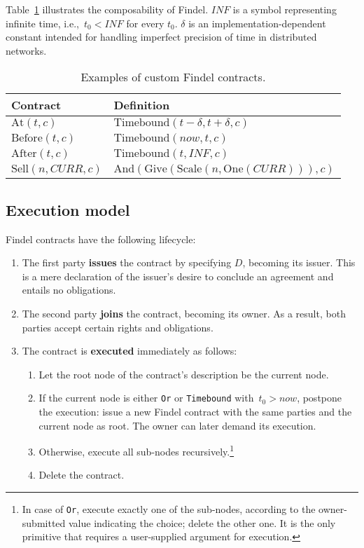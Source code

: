 Table~\ref{tab:Ch10FindelComposability} illustrates the composability of Findel.
$INF$ is a symbol representing infinite time, i.e.,~$t_0 < INF$ for every $t_0$.
$\delta$ is an implementation-dependent constant intended for handling imperfect precision of time in distributed networks.

\begin{table}
	\centering
	\caption{Examples of custom Findel contracts.}
	\begin{tabular}{|p{0.25\linewidth}|p{0.70\linewidth}|}
		\hline
		\textbf{Contract} & \textbf{Definition} \\
		\hline
		\(\mathrm{At}(t, c)\) & \(\mathrm{Timebound}(t - \delta, t + \delta, c)\) \\
		\hline
		\(\mathrm{Before}(t, c)\) & \(\mathrm{Timebound}(now, t, c)\) \\
		\hline
		\(\mathrm{After}(t, c)\) & \(\mathrm{Timebound}(t, INF, c)\) \\
		\hline
		\(\mathrm{Sell}(n, CURR, c)\) & \(\mathrm{And}(\mathrm{Give}(\mathrm{Scale}(n,\mathrm{One}(CURR))),c)\) \\
		\hline
	\end{tabular}
	\label{tab:Ch10FindelComposability}
\end{table}



\subsection{Execution model} \label{sec:Ch10FindelExecutionModel}

Findel contracts have the following lifecycle:

\begin{enumerate}
	\item The first party \textbf{issues} the contract by specifying $D$, becoming its issuer. This is a mere declaration of the issuer's desire to conclude an agreement and entails no obligations.
	\item The second party \textbf{joins} the contract, becoming its owner. As a result, both parties accept certain rights and obligations.
	\item The contract is \textbf{executed} immediately as follows:
	\begin{enumerate}
		\item Let the root node of the contract's description be the current node.
		\item If the current node is either \texttt{Or} or \texttt{Timebound} with~$t_0 > now$, postpone the execution: issue a new Findel contract with the same parties and the current node as root. The owner can later demand its execution.
		\item Otherwise, execute all sub-nodes recursively.\footnote{In case of \texttt{Or}, execute exactly one of the sub-nodes, according to the owner-submitted value indicating the choice; delete the other one. It is the only primitive that requires a user-supplied argument for execution.}
		\item Delete the contract.
	\end{enumerate}
\end{enumerate}

